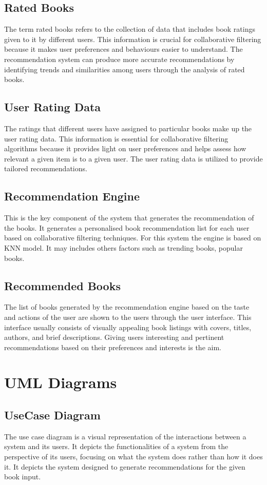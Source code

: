     \subsection{Rated Books}  
    The term rated books refers to the collection of data that includes book ratings given to it by different users. This information is crucial for collaborative filtering because it makes user preferences and behaviours easier to understand. The recommendation system can produce more accurate recommendations by identifying trends and similarities among users through the analysis of rated books.  
    \subsection{User Rating Data} 
    The ratings that different users have assigned to particular books make up the user rating data. This information is essential for collaborative filtering algorithms because it provides light on user preferences and helps assess how relevant a given item is to a given user. The user rating data is utilized to provide tailored recommendations.
    \subsection{Recommendation Engine}
    This is the key component of the system that generates the recommendation of the books. It generates a personalised book recommendation list for each user based on collaborative filtering techniques. For this system the engine is based on KNN model. It may includes others factors such as trending books, popular books.
    \subsection{Recommended Books}
    The list of books generated by the recommendation engine based on the taste and actions of the user are shown to the users through the user interface. This interface usually consists of visually appealing book listings with covers, titles, authors, and brief descriptions. Giving users interesting and pertinent recommendations based on their preferences and interests is the aim.

\newpage
\section{UML Diagrams}

\subsection{UseCase Diagram}
The use case diagram is a visual representation of the interactions between a system
and its users. It depicts the functionalities of a system from the perspective of its users,
focusing on what the system does rather than how it does it. It depicts the system
designed to generate recommendations for the given book input. 

